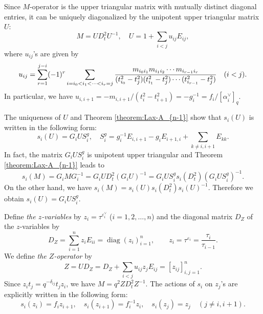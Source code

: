 \documentclass[12pt,twoside]{article}
\newcommand\av{\alpha^\vee}
\newcommand\eps{\varepsilon}
\newcommand\epsv{\eps^\vee}
\newcommand\diag{\mathop{\mathrm{diag}}\nolimits}
\theoremstyle{plain} %
\theoremstyle{definition} %
\theoremstyle{definition} %
\numberwithin{theorem}{section}
\numberwithin{equation}{section}
\numberwithin{figure}{section}
\numberwithin{table}{section}
\newcommand\theoremref[1]{Theorem \ref{#1}}
\begin{document}
Since $M$-operator is the upper triangular matrix with
mutually distinct diagonal entries, 
it can be uniquely diagonalized 
by the unipotent upper triangular matrix $U$:
\begin{equation*}
 M = U D_t^2 U^{-1}, \quad
 U = 1 + \sum_{i<j} u_{ij} E_{ij},
\end{equation*}
where $u_{ij}$'s are given by
\begin{equation}
 u_{ij} 
 = \sum_{r=1}^{j-i}(-1)^r
   \sum_{i=i_0<i_1<\cdots<i_r=j}
   \frac{m_{i_0i_1}m_{i_1i_2}\cdots m_{i_{r-1}i_r}}
        {(t_{i_0}^2-t_j^2)(t_{i_1}^2-t_j^2)\cdots(t_{i_{r-1}}^2-t_j^2)}
 \quad (i<j).
 \label{eq:u_{ij}}
\end{equation}
In particular, we have 
$u_{i,i+1} = -m_{i,i+1}/(t_i^2-t_{i+1}^2)=-g_i^{-1} = f_i/[\av_i]_q$. 

The uniqueness of $U$ and \theoremref{theorem:Lax-A_{n-1}} show that
$s_i(U)$ is written in the following form:
\begin{equation}
 s_i(U) = G_i U S_i^g, \quad
 S_i^g = g_i^{-1} E_{i,i+1} - g_i E_{i+1,i} + \sum_{k\ne i,i+1} E_{kk}.
 \label{eq:s_i(U)}
\end{equation}
In fact, the matrix $G_i U S_i^g$ is unipotent upper triangular 
and \theoremref{theorem:Lax-A_{n-1}} leads to
\begin{equation*}
 s_i(M) 
 = G_i M G_i^{-1}
 = G_i U D_t^2 (G_i U)^{-1}
 = G_i U S_i^g s_i(D_t^2) (G_i U S_i^g)^{-1}.
\end{equation*}
On the other hand, we have $s_i(M)=s_i(U)s_i(D_t^2)s_i(U)^{-1}$.
Therefore we obtain $s_i(U)=G_i U S_i^g$.

Define {\em the $z$-variables} by $z_i = \tau^{\epsv_i}$ ($i=1,2,\ldots,n$) 
and the diagonal matrix $D_Z$ of the $z$-variables by
\begin{equation*}
 D_Z = \sum_{i=1}^n z_i E_{ii} = \diag(z_i)_{i=1}^n,
 \qquad z_i = \tau^{\eps_i} = \frac{\tau_i}{\tau_{i-1}}.
\end{equation*}
We define {\em the $Z$-operator} by
\begin{equation*}
 Z = U D_Z = D_Z + \sum_{i<j} u_{ij}z_j E_{ij} = [z_{ij}]_{i,j=1}^n.
\end{equation*}
Since $z_i t_j = q^{-\delta_{ij}} t_j z_i$, 
we have $M = q^2 Z D_t^2 Z^{-1}$. 
The actions of $s_i$ on $z_j$'s are explicitly written in the following form:
\begin{equation*}
 s_i(z_i)= f_i z_{i+1}, \quad
 s_i(z_{i+1}) = f_i^{-1} z_i, \quad
 s_i(z_j) = z_j \quad (j\ne i,i+1).
\end{equation*}
\end{document}
